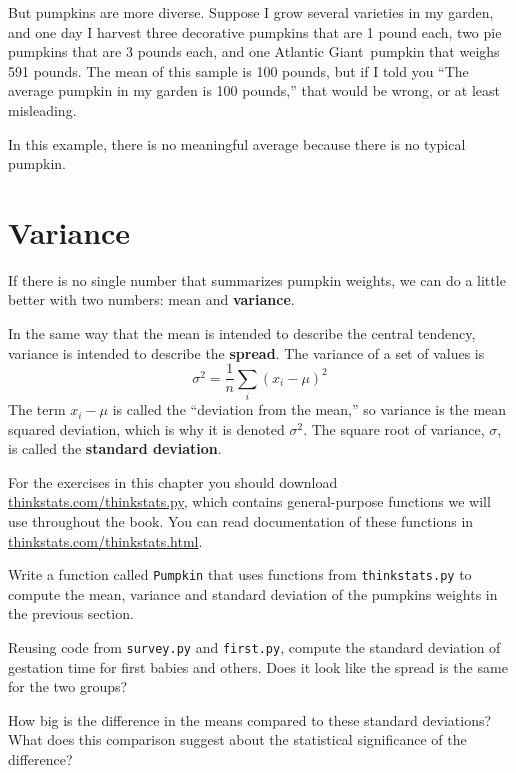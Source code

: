 \documentclass[12pt]{book}
\begin{document}
But pumpkins are more diverse.  Suppose I grow several varieties in my
garden, and one day I harvest three decorative pumpkins that are 1
pound each, two pie pumpkins that are 3 pounds each, and one Atlantic
Giant\textregistered~pumpkin that weighs 591 pounds.  The mean of
this sample is 100 pounds, but if I told you ``The average pumpkin
in my garden is 100 pounds,'' that would be wrong, or at least
misleading.

In this example, there is no meaningful average because
there is no typical pumpkin.

\section{Variance}

If there is no single number that summarizes pumpkin weights,
we can do a little better with two numbers: mean and {\bf variance}.

In the same way that the mean is intended to describe the central
tendency, variance is intended to describe the {\bf spread}.
The variance of a set of values is
%
\[ \sigma^2 = \frac{1}{n} \sum_i (x_i - \mu)^2 \]
%
The term $x_i - \mu$ is called the ``deviation from the mean,'' so
variance is the mean squared deviation, which is why it is denoted
$\sigma^2$.  The square root of variance, $\sigma$, is called the {\bf
  standard deviation}.

\begin{ex}
For the exercises in this chapter you should download
\url{thinkstats.com/thinkstats.py}, which contains general-purpose
functions we will use throughout the book.  You can read documentation
of these functions in \url{thinkstats.com/thinkstats.html}.

Write a function called
{\tt Pumpkin} that uses functions from {\tt thinkstats.py} to compute
the mean, variance and standard deviation of the pumpkins weights in
the previous section.
\end{ex}

\begin{ex}
Reusing code from {\tt survey.py} and {\tt first.py}, compute the
standard deviation of gestation time for first babies and others.
Does it look like the spread is the same for the two groups?

How big is the difference in the means compared to these standard
deviations?  What does this comparison suggest about the statistical
significance of the difference?
\end{ex}
\end{document}
